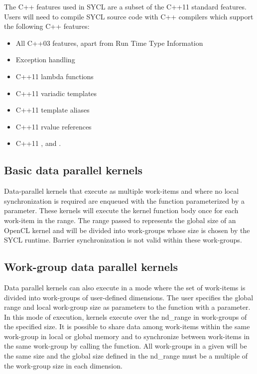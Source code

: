 The C++ features used in SYCL are a subset of the C++11 standard features.
Users will need to compile SYCL source code with C++ compilers which support
the following C++ features:
\begin{itemize}
\item All C++03 features, apart from Run Time Type Information
\item Exception handling
\item C++11 lambda functions
\item C++11 variadic templates
\item C++11 template aliases
\item C++11 rvalue references
\item C++11 ,  and
  .
\end{itemize}

\subsection{Basic data parallel kernels} 

Data-parallel kernels that execute as
multiple work-items and where no local synchronization is required are enqueued
with the  function parameterized by a
 parameter. These kernels will execute the kernel
function body once for each work-item in the range. The range passed to
 represents the global size of an OpenCL
kernel and will be divided into work-groups whose size is chosen by the SYCL
runtime. Barrier synchronization is not valid within these work-groups.

\subsection{Work-group data parallel kernels}

Data parallel kernels can also execute in a mode where the set of
work-items is divided into work-groups of user-defined dimensions.
The user specifies the global range and local work-group size as
parameters to the  function with a
 parameter. In this mode of execution,
kernels execute over the nd_range in work-groups of the specified
size. It is possible to share data among work-items within the same
work-group in local or global memory and to synchronize between
work-items in the same work-group by calling the 
 function. All work-groups in a given
 will be the same size and the global size
defined in the nd_range must be a multiple of the work-group size in
each dimension.


